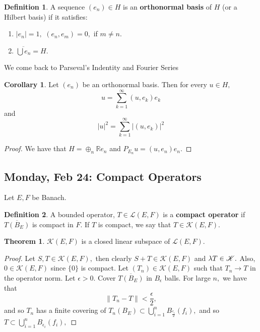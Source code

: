 \documentclass[10pt, oneside]{article}
\newcommand{\bbR}{\mathbb{R}}
\theoremstyle{definition}
\newtheorem{thm}{Theorem}
\newtheorem{defn}{Definition}
\newtheorem{cor}{Corollary}
\begin{document}
\begin{defn}
    A sequence $(e_n) \in H$ is an \textbf{orthonormal basis} of $H$ (or a Hilbert basis) if it satisfies:
    \begin{enumerate}
        \item $|e_n| = 1,$ $(e_n, e_m) =0,$ if $m\neq n.$
        \item $\overline{\bigcup e_n} = H.$
    \end{enumerate}
\end{defn}
We come back to Parseval's Indentity and Fourier Series
\begin{cor}
    Let $(e_n)$ be an orthonormal basis. Then for every $u \in H,$
    \[ u = \sum_{k=1}^\infty (u, e_k)e_k \] and 
    \[|u|^2 = \sum_{k=1}^\infty |(u, e_k)|^2\]
\end{cor}
\begin{proof}
    We have that $H = \oplus_{n}\bbR e_n$ and $P_{E_n}u = (u, e_n)e_n.$
\end{proof}

\newpage
\subsection{Monday, Feb 24: Compact Operators}
Let $E,F$ be Banach.
\begin{defn}
    A bounded operator, $T\in \mathcal{L}(E,F)$ is a \textbf{compact operator} if $\overline{T(B_E)}$ is compact in $F.$ If $T$ is compact, we say that $T\in \mathcal{K}(E,F).$
\end{defn}
\begin{thm}
    $\mathcal{K}(E,F)$ is a closed linear subspace of $\mathcal{L}(E,F).$
\end{thm}
\begin{proof}
    Let $S, T \in\mathcal{K}(E, F),$ then clearly $S + T \in \mathcal{K}(E,F)$ and $\lambda T \in \cal K.$ Also, $0 \in \mathcal{K}(E,F)$ since $\{0\}$ is compact. Let $(T_n)\in \mathcal{K}(E,F)$ such that $T_n \to T$ in the operator norm. Let $\epsilon>0.$ Cover $\overline{T(B_E)}$ in $B_\epsilon$ balls. For large $n,$ we have that 
    \[\|T_n - T\|< \frac{\epsilon}{2},\] and so $T_n$ has a finite covering of $T_n(B_E)\subset\bigcup_{i=1}^n B_{\frac{\epsilon_i}2}(f_i),$ and so $T\subset \bigcup_{i=1}^n B_{\epsilon_i}(f_i),$
\end{proof}
\end{document}

